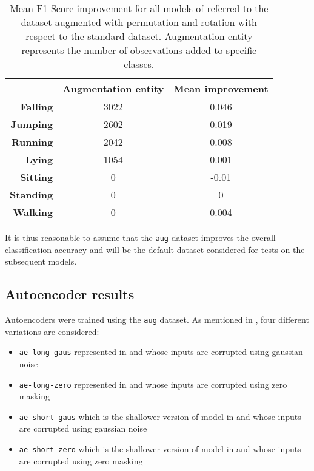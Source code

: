 \begin{table}[!htbp]
\footnotesize
\captionsetup{font=scriptsize, justification=centering}
\centering
\begin{tabular}{|r|c|c|}
\hline
 & \textbf{Augmentation entity} & \textbf{Mean improvement} \\ \hline
\textbf{Falling} & 3022 & 0.046 \\ \hline
\textbf{Jumping} & 2602 & 0.019 \\ \hline
\textbf{Running} & 2042 & 0.008 \\ \hline
\textbf{Lying} & 1054 & 0.001 \\ \hline
\textbf{Sitting} & 0 & -0.01 \\ \hline
\textbf{Standing} & 0 & 0 \\ \hline
\textbf{Walking} & 0 & 0.004 \\ \hline
\end{tabular}
\caption{Mean F1-Score improvement for all models of  referred to the dataset augmented with permutation and rotation with respect to the standard dataset. Augmentation entity represents the number of observations added to specific classes.}
\label{datasets_improvement_table}
\end{table}

It is thus reasonable to assume that the \texttt{aug} dataset improves the overall classification accuracy and will be the default dataset considered for tests on the subsequent models.

\subsection{Autoencoder results}
\label{sec:autoencoder_results}
Autoencoders were trained using the \texttt{aug} dataset. As mentioned in , four different variations are considered:
\begin{itemize}
\item \texttt{ae-long-gaus} represented in  and whose inputs are corrupted using gaussian noise
\item \texttt{ae-long-zero} represented in  and whose inputs are corrupted using zero masking
\item \texttt{ae-short-gaus} which is the shallower version of model in  and whose inputs are corrupted using gaussian noise
\item \texttt{ae-short-zero} which is the shallower version of model in  and whose inputs are corrupted using zero masking
\end{itemize}

